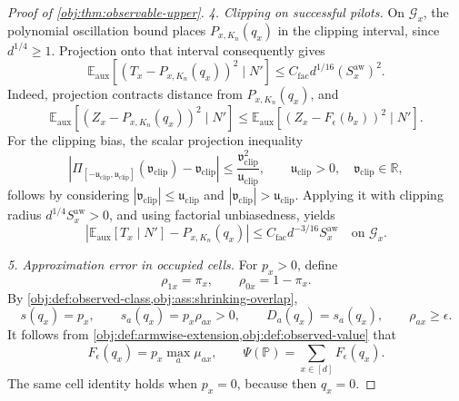 \begin{proof}[Proof of \cref{obj:thm:observable-upper}]
\textit{4. Clipping on successful pilots.}
On \(\mathcal G_x\), the polynomial oscillation bound places \(P_{x,K_n}(q_x)\) in the clipping interval, since \(d^{1/4}\ge1\). Projection onto that interval consequently gives
\[
\mathbb E_{\mathrm{aux}}
[(T_x-P_{x,K_n}(q_x))^2\mid N']
\le
C_{\mathrm{fac}}d^{1/16}(S_x^{\mathrm{aw}})^2.
\]
Indeed, projection contracts distance from \(P_{x,K_n}(q_x)\), and
\[
\mathbb E_{\mathrm{aux}}
[(Z_x-P_{x,K_n}(q_x))^2\mid N']
\le
\mathbb E_{\mathrm{aux}}
[(Z_x-F_\epsilon(b_x))^2\mid N'].
\]
For the clipping bias, the scalar projection inequality
\[
|\Pi_{[-\mathfrak u_{\mathrm{clip}},\mathfrak u_{\mathrm{clip}}]}(\mathfrak v_{\mathrm{clip}})-\mathfrak v_{\mathrm{clip}}|
\le\frac{\mathfrak v_{\mathrm{clip}}^2}{\mathfrak u_{\mathrm{clip}}},
\qquad \mathfrak u_{\mathrm{clip}}>0,\quad
\mathfrak v_{\mathrm{clip}}\in\mathbb R,
\]
follows by considering \(|\mathfrak v_{\mathrm{clip}}|\le\mathfrak u_{\mathrm{clip}}\) and \(|\mathfrak v_{\mathrm{clip}}|>\mathfrak u_{\mathrm{clip}}\). Applying it with clipping radius \(d^{1/4}S_x^{\mathrm{aw}}>0\), and using factorial unbiasedness, yields
\[
\left|
\mathbb E_{\mathrm{aux}}[T_x\mid N']-P_{x,K_n}(q_x)
\right|
\le C_{\mathrm{fac}}d^{-3/16}S_x^{\mathrm{aw}}
\quad\text{on }\mathcal G_x.
\]

\textit{5. Approximation error in occupied cells.}
For \(p_x>0\), define
\[
\rho_{1x}=\pi_x,\qquad \rho_{0x}=1-\pi_x.
\]
By \cref{obj:def:observed-class,obj:ass:shrinking-overlap},
\[
s(q_x)=p_x,\qquad
s_a(q_x)=p_x\rho_{ax}>0,\qquad
D_a(q_x)=s_a(q_x),\qquad
\rho_{ax}\ge\epsilon.
\]
It follows from \cref{obj:def:armwise-extension,obj:def:observed-value} that
\[
F_\epsilon(q_x)=p_x\max_a\mu_{ax},
\qquad
\Psi(\mathbb P)=\sum_{x\in[d]}F_\epsilon(q_x).
\]
The same cell identity holds when \(p_x=0\), because then \(q_x=0\).


\end{proof}

